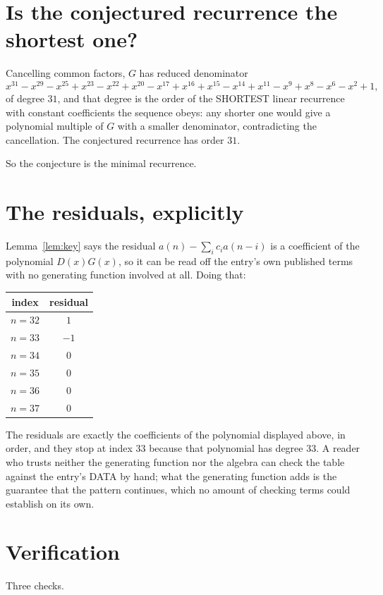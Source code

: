 \documentclass[11pt,a4paper]{article}
\theoremstyle{plain}
\theoremstyle{definition}
\begin{document}
\section{Is the conjectured recurrence the shortest one?}

Cancelling common factors, $G$ has reduced denominator
\[
x^{31} - x^{29} - x^{25} + x^{23} - x^{22} + x^{20} - x^{17} + x^{16} + x^{15} - x^{14} + x^{11} - x^{9} + x^{8} - x^{6} - x^{2} + 1,
\]
of degree $31$, and that degree is the order of the SHORTEST linear recurrence with
constant coefficients the sequence obeys: any shorter one would give a polynomial multiple of
$G$ with a smaller denominator, contradicting the cancellation. The conjectured recurrence has
order $31$.

So the conjecture is the minimal recurrence.

\section{The residuals, explicitly}

Lemma~\ref{lem:key} says the residual $a(n)-\sum_ic_ia(n-i)$ is a coefficient of the
polynomial $D(x)G(x)$, so it can be read off the entry's own published terms with no
generating function involved at all. Doing that:
\begin{center}
\begin{tabular}{cc}
index & residual \\ \hline
$n=32$ & $1$ \\
$n=33$ & $-1$ \\
$n=34$ & $0$ \\
$n=35$ & $0$ \\
$n=36$ & $0$ \\
$n=37$ & $0$
\end{tabular}
\end{center}
The residuals are exactly the coefficients of the polynomial displayed above, in order, and
they stop at index $33$ because that polynomial has degree $33$. A reader who trusts
neither the generating function nor the algebra can check the table against the entry's DATA
by hand; what the generating function adds is the guarantee that the pattern continues, which
no amount of checking terms could establish on its own.

\section{Verification}

Three checks.
\end{document}
